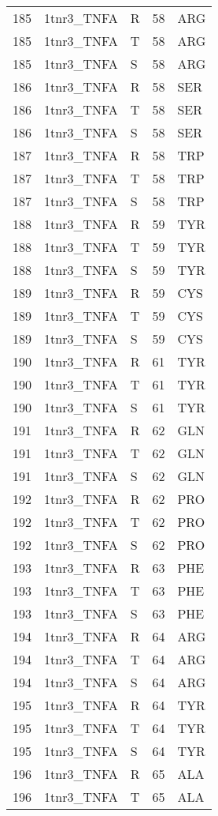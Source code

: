 \begin{longtable}[l]{l|l|l|l|l}
	185 & 1tnr3_TNFA & R & 58 & ARG \\
	185 & 1tnr3_TNFA & T & 58 & ARG \\
	185 & 1tnr3_TNFA & S & 58 & ARG \\
	186 & 1tnr3_TNFA & R & 58 & SER \\
	186 & 1tnr3_TNFA & T & 58 & SER \\
	186 & 1tnr3_TNFA & S & 58 & SER \\
	187 & 1tnr3_TNFA & R & 58 & TRP \\
	187 & 1tnr3_TNFA & T & 58 & TRP \\
	187 & 1tnr3_TNFA & S & 58 & TRP \\
	188 & 1tnr3_TNFA & R & 59 & TYR \\
	188 & 1tnr3_TNFA & T & 59 & TYR \\
	188 & 1tnr3_TNFA & S & 59 & TYR \\
	189 & 1tnr3_TNFA & R & 59 & CYS \\
	189 & 1tnr3_TNFA & T & 59 & CYS \\
	189 & 1tnr3_TNFA & S & 59 & CYS \\
	190 & 1tnr3_TNFA & R & 61 & TYR \\
	190 & 1tnr3_TNFA & T & 61 & TYR \\
	190 & 1tnr3_TNFA & S & 61 & TYR \\
	191 & 1tnr3_TNFA & R & 62 & GLN \\
	191 & 1tnr3_TNFA & T & 62 & GLN \\
	191 & 1tnr3_TNFA & S & 62 & GLN \\
	192 & 1tnr3_TNFA & R & 62 & PRO \\
	192 & 1tnr3_TNFA & T & 62 & PRO \\
	192 & 1tnr3_TNFA & S & 62 & PRO \\
	193 & 1tnr3_TNFA & R & 63 & PHE \\
	193 & 1tnr3_TNFA & T & 63 & PHE \\
	193 & 1tnr3_TNFA & S & 63 & PHE \\
	194 & 1tnr3_TNFA & R & 64 & ARG \\
	194 & 1tnr3_TNFA & T & 64 & ARG \\
	194 & 1tnr3_TNFA & S & 64 & ARG \\
	195 & 1tnr3_TNFA & R & 64 & TYR \\
	195 & 1tnr3_TNFA & T & 64 & TYR \\
	195 & 1tnr3_TNFA & S & 64 & TYR \\
	196 & 1tnr3_TNFA & R & 65 & ALA \\
	196 & 1tnr3_TNFA & T & 65 & ALA \\

\end{longtable}
